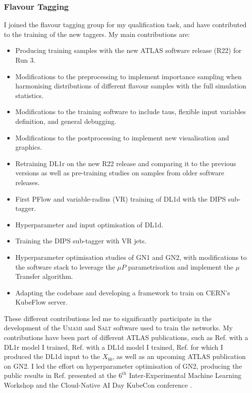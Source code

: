 \subsubsection{Flavour Tagging}
I joined the flavour tagging group for my qualification task, and have contributed to the training of the new taggers. My main contributions are:
\begin{itemize}
    \item Producing training samples with the new ATLAS software release (R22) for Run 3.
    \item Modifications to the preprocessing to implement importance sampling when harmonising distributions of different flavour samples with the full simulation statistics.
    \item Modifications to the training software to include taus, flexible input variables definition, and general debugging.
    \item Modifications to the postprocessing to implement new visualisation and graphics. 
    \item Retraining DL1r on the new R22 release and comparing it to the previous versions as well as pre-training studies on samples from older software releases. 
    \item First PFlow and variable-radius (VR) training of DL1d with the DIPS sub-tagger.
    \item Hyperparameter and input optimisation of DL1d.
    \item Training the DIPS sub-tagger with VR jets.
    \item Hyperparameter optimisation studies of GN1 and GN2, with modifications to the software stack to leverage the $\mu P$ parametrisation and implement the $\mu$Transfer algorithm.
    \item Adapting the codebase and developing a framework to train on CERN's KubeFlow server. 
\end{itemize}
These different contributions led me to significantly participate in the development of the \textsc{Umami} \cite{UmamiCite} and \textsc{Salt} \cite{SaltCite} software used to train the networks. My contributions have been part of different ATLAS publications, such as Ref. \cite{ATL-PHYS-PUB-2022-027} with a DL1r model I trained, Ref. \cite{ATL-PLOT-FTAG-2023-01} with a DL1d model I trained, Ref. \cite{ATL-PHYS-PUB-2023-021} for which I produced the DL1d input to the $X_{bb}$, as well as an upcoming ATLAS publication on GN2. I led the effort on hyperparameter optimisation of GN2, producing the public results in Ref. \cite{publicplotMUP} presented at the $6^{th}$ Inter-Experimental Machine Learning Workshop \cite{IMLTalk} and the Cloud-Native AI Day KubeCon conference \cite{KubeconTalk}.

